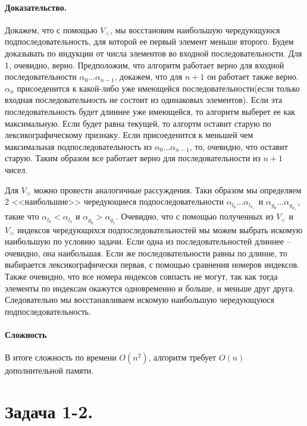 \documentclass[12pt]{article}
\begin{document}
\paragraph{Доказательство.}
Докажем, что с помощью $ V_< $, мы восстановим наибольшую чередующуюся подпоследовательность, 
для которой ее первый элемент меньше второго.
Будем доказывать по индукции от числа элементов во входной последовательности. Для 1, очевидно, верно.
Предположим, что алгоритм работает верно для входной последовательности $ \alpha_0 \dots \alpha_{n - 1} $,
докажем, что для $ n + 1 $ он работает также верно.
$\alpha_n$ присоеденится к какой-либо уже имеющейся последовательности(если только входная последовательность
не состоит из одинаковых элементов). Если эта последовательность будет длиннее уже имеющейся, то алгоритм
выберет ее как максимальную. Если будет равна текущей, то алгортм оставит старую по лексикографическому
признаку. Если присоеденится к меньшей чем максимальная подпоследовательность из $ \alpha_0 \dots \alpha_{n - 1} $,
то, очевидно, что оставит старую. Таким образом все работает верно для последовательности из $ n + 1 $ чисел.

Для $ V_> $ можно провести аналогичные рассуждения. Таки образом мы определяем 2 <<наибольшие>>
чередующиеся подпоследовательности $ \alpha_{l_0}\dots\alpha_{l_{k_<}} $ и $ \alpha_{g_0}\dots\alpha_{g_{k_>}} $, такие что $ \alpha_{l_0} < \alpha_{l_1} $
и $ \alpha_{g_0} > \alpha_{g_1} $.
Очевидно, что с помощью полученных из $ V_< $ и $ V_> $ индексов чередующихся подпоследовательностей мы можем
выбрать искомую наибольшую по условию задачи. Если одна из последовательностей длиннее -- очевидно, она наибольшая.
Если же последовательности равны по длинне, то выбирается лексикографически первая, с помощью сравнения номеров 
индексов. Также очевидно, что все номера индексов совпасть не могут, так как тогда элементы по индексам окажутся
одновременно и больше, и меньше друг друга. Следовательно мы восстанавливаем искомую наибольшую чередующуюся
подпоследовательность.



\paragraph{Сложность}
В итоге сложность по времени $ O(n^2) $, алгоритм требует $ O(n) $ дополнительной памяти.




\section{Задача 1-2.} 
\end{document}
